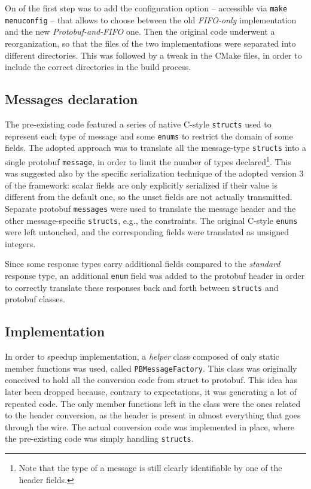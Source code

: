 On of the first step was to add the configuration option -- accessible via \texttt{make menuconfig} -- that allows to choose between the old \emph{FIFO-only} implementation and the new \emph{Protobuf-and-FIFO} one. Then the original code underwent a reorganization, so that the files of the two implementations were separated into different directories. This was followed by a tweak in the CMake files, in order to include the correct directories in the build process.

\subsection{Messages declaration}
\label{sec:messages-declaration}

The pre-existing code featured a series of native C-style \texttt{structs} used to represent each type of message and some \texttt{enums} to restrict the domain of some fields. The adopted approach was to translate all the message-type \texttt{structs} into a single protobuf \texttt{message}, in order to limit the number of types declared\footnote{Note that the type of a message is still clearly identifiable by one of the header fields.}. This was suggested also by the specific serialization technique of the adopted version 3 of the framework: scalar fields are only explicitly serialized if their value is different from the default one, so the unset fields are not actually transmitted. Separate protobuf \texttt{messages} were used to translate the message header and the other message-specific \texttt{structs}, e.g.,  the constraints. The original C-style \texttt{enums} were left untouched, and the corresponding fields were translated as unsigned integers.

Since some response types carry additional fields compared to the \emph{standard} response type, an additional \texttt{enum} field was added to the protobuf header in order to correctly translate these responses back and forth between \texttt{structs} and protobuf classes.

\subsection{Implementation}

In order to speedup implementation, a \emph{helper} class composed of only static member functions was used, called \texttt{PBMessageFactory}. This class was originally conceived to hold all the conversion code from struct to protobuf. This idea has later been dropped because, contrary to expectations, it was generating a lot of repeated code. The only member functions left in the class were the ones related to the header conversion, as the header is present in almost everything that goes through the wire. The actual conversion code was implemented in place, where the pre-existing code was simply handling \texttt{structs}.

